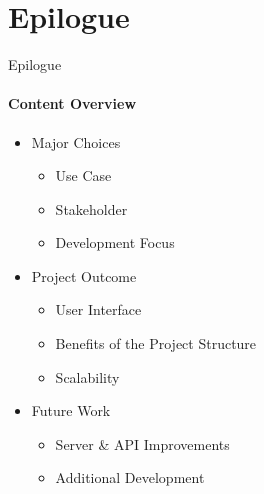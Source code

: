 \author{Marc4Prez}
\section{Epilogue}
    \begin{frame}{Epilogue}\framesubtitle{Content Overview}
        \begin{itemize}
            \item<1-> Major Choices
            \begin{itemize}
                    \item Use Case
                    \item Stakeholder 
                    \item Development Focus
            \end{itemize}
            \item<2-> Project Outcome
                \begin{itemize}
                    \item User Interface
                    \item Benefits of the Project Structure 
                    \item Scalability
                \end{itemize}
            \item<3-> Future Work
            \begin{itemize}
                \item Server \& API Improvements
                \item Additional Development
            \end{itemize}
        \end{itemize}
    \end{frame}

